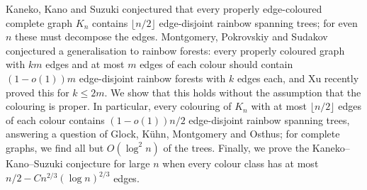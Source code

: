 Kaneko, Kano and Suzuki conjectured that every properly edge-coloured complete graph $K_n$ contains $\lfloor n/2\rfloor$ edge-disjoint rainbow spanning trees; for even $n$ these must decompose the edges.
Montgomery, Pokrovskiy and Sudakov conjectured a generalisation to rainbow forests: every properly coloured graph with $km$ edges and at most $m$ edges of each colour should contain $(1-o(1))m$ edge-disjoint rainbow forests with $k$ edges each, and Xu recently proved this for $k\le 2m$.
We show that this holds without the assumption that the colouring is proper.
In particular, every colouring of $K_n$ with at most $\lfloor n/2\rfloor$ edges of each colour contains $(1-o(1))n/2$ edge-disjoint rainbow spanning trees, answering a question of Glock, K\"uhn, Montgomery and Osthus; for complete graphs, we find all but $O(\log^2 n)$ of the trees.
Finally, we prove the Kaneko--Kano--Suzuki conjecture for large $n$ when every colour class has at most $n/2-Cn^{2/3}(\log n)^{2/3}$ edges.
